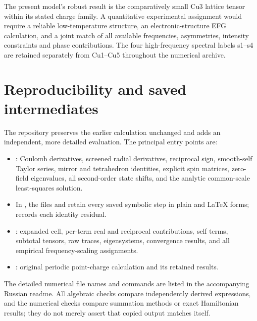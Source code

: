 \documentclass[11pt,a4paper]{article}
\begin{document}
The present model's robust result is the comparatively small Cu3 lattice tensor
within its stated charge family. A quantitative experimental assignment would
require a reliable low-temperature structure, an electronic-structure EFG
calculation, and a joint match of all available frequencies, asymmetries,
intensity constraints and phase contributions. The four high-frequency spectral
labels s1--s4 are retained separately from Cu1--Cu5 throughout the numerical
archive.

\section{Reproducibility and saved intermediates}

The repository preserves the earlier calculation unchanged and adds an
independent, more detailed evaluation. The principal entry points are:
\begin{itemize}
\item {}: Coulomb derivatives, screened radial
derivatives, reciprocal sign, smooth-self Taylor series, mirror and tetrahedron
identities, explicit spin matrices, zero-field eigenvalues, all second-order
state shifts, and the analytic common-scale least-squares solution.
\item In , the files  and
 retain every saved symbolic step in plain
and LaTeX forms;  records each identity residual.
\item {}: expanded cell, per-term real and reciprocal
contributions, self terms, subtotal tensors, raw traces, eigensystems,
convergence results, and all empirical frequency-scaling assignments.
\item {}: original
periodic point-charge calculation and its retained results.
\end{itemize}
The detailed numerical file names and commands are listed in the accompanying
Russian readme. All algebraic checks compare independently derived expressions,
and the numerical checks compare summation methods or exact Hamiltonian results;
they do not merely assert that copied output matches itself.
\end{document}
